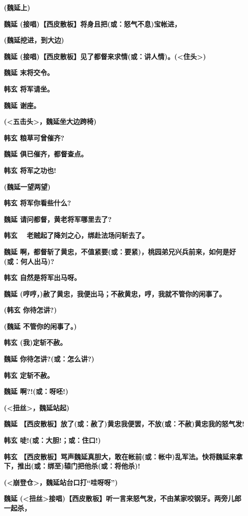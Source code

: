 \textbf{(魏延上)}

\textbf{魏延 (接唱)【西皮散板】将身且把(或：怒气不息)宝帐进，}

\textbf{(魏延挖进，到大边)}

\textbf{魏延
(接唱)【西皮散板】见了都督来求情(或：讲人情)。(\textless{}住头\textgreater{})}

\textbf{魏延 末将交令。}

\textbf{韩玄 将军请坐。}

\textbf{魏延 谢座。}

\textbf{(\textless{}五击头\textgreater{}，魏延坐大边跨椅)}

\textbf{韩玄 粮草可曾催齐?}

\textbf{魏延 俱已催齐，都督查点。}

\textbf{韩玄 将军之功也!}

\textbf{(魏延一望两望)}

\textbf{韩玄 将军你看些什么?}

\textbf{魏延 请问都督，黄老将军哪里去了?}

\textbf{韩玄　 老贼起了降刘之心，绑赴法场问斩去了。}

\textbf{魏延
啊，都督斩了黄忠，不值紧要(或：要紧)，桃园弟兄兴兵前来，如何是好(或：何人出马)?}

\textbf{韩玄 自然是将军出马呀。}

\textbf{魏延
(哼哼，)赦了黄忠，我便出马；不赦黄忠，哼，我就不管你的闲事了。}

\textbf{(韩玄 你待怎讲?)}

\textbf{(魏延 不管你的闲事了。)}

\textbf{韩玄 (我)定斩不赦。}

\textbf{魏延 你待怎讲?(或：怎么讲?)}

\textbf{韩玄 定斩不赦。}

\textbf{魏延 啊?!(或：呀呸!)}

\textbf{(\textless{}扭丝\textgreater{}，魏延站起)}

\textbf{魏延
【西皮散板】放了(或：赦了)黄忠我便罢，不放(或：不赦)黄忠我的怒气发!}

\textbf{韩玄 唗!(或：大胆!；或：住口!)}

\textbf{韩玄
【西皮散板】骂声魏延真胆大，敢在帐前(或：帐中)乱军法。快将魏延来拿下，推出(或：绑至)辕门把他杀(或：将他杀)!}

\textbf{(\textless{}崩登仓\textgreater{}，魏延站台口打``哇呀呀'')}

\textbf{魏延
(\textless{}扭丝\textgreater{}接唱)【西皮散板】听一言来怒气发，不由某家咬钢牙。两旁儿郎一起杀，}

